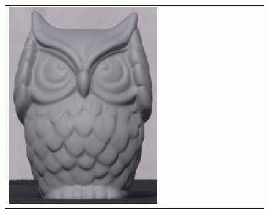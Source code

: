 \begin{figure}[!ht]
\begin{tabular}{@{}rcccccccccccc@{}}
    \includegraphics[width=\customwidth]{./figures/reconstruction/object/130215.jpg} &

\end{tabular}
\end{figure}
